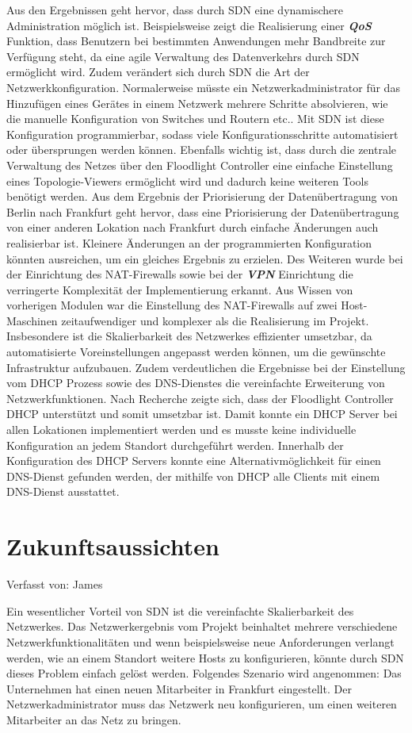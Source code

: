 \documentclass[fontsize=12pt,paper=a4,open=any,parskip=half,
  twoside=false,toc=listof,toc=bibliography,fleqn,leqno,
  captions=nooneline,captions=tableabove,british]{scrbook}
\begin{document}
{Aus den Ergebnissen geht hervor, dass durch SDN eine dynamischere Administration möglich ist. Beispielsweise zeigt die Realisierung einer \textit{\textbf{QoS}} Funktion, dass Benutzern bei bestimmten Anwendungen mehr Bandbreite zur Verfügung steht, da eine agile Verwaltung des Datenverkehrs durch SDN ermöglicht wird. Zudem verändert sich durch SDN die Art der Netzwerkkonfiguration. Normalerweise müsste ein Netzwerkadministrator für das Hinzufügen eines Gerätes in einem Netzwerk mehrere Schritte absolvieren, wie die manuelle Konfiguration von Switches und Routern etc.. Mit SDN ist diese Konfiguration programmierbar, sodass viele Konfigurationsschritte automatisiert oder übersprungen werden können. Ebenfalls wichtig ist, dass durch die zentrale Verwaltung des Netzes über den Floodlight Controller eine einfache Einstellung eines Topologie-Viewers ermöglicht wird und dadurch keine weiteren Tools benötigt werden. Aus dem Ergebnis der Priorisierung der Datenübertragung von Berlin nach Frankfurt geht hervor, dass eine Priorisierung der Datenübertragung von einer anderen Lokation nach Frankfurt durch einfache Änderungen auch realisierbar ist. Kleinere Änderungen an der programmierten Konfiguration könnten ausreichen, um ein gleiches Ergebnis zu erzielen. Des Weiteren wurde bei der Einrichtung des NAT-Firewalls sowie bei der \textit{\textbf{VPN}} Einrichtung die verringerte Komplexität der Implementierung erkannt. Aus Wissen von vorherigen Modulen war die Einstellung des NAT-Firewalls auf zwei Host-Maschinen zeitaufwendiger und komplexer als die Realisierung im Projekt. Insbesondere ist die Skalierbarkeit des Netzwerkes effizienter umsetzbar, da automatisierte Voreinstellungen angepasst werden können, um die gewünschte Infrastruktur aufzubauen. Zudem verdeutlichen die Ergebnisse bei der Einstellung vom DHCP Prozess sowie des DNS-Dienstes die vereinfachte Erweiterung von Netzwerkfunktionen.  Nach Recherche zeigte sich, dass der Floodlight Controller DHCP unterstützt und somit umsetzbar ist. Damit konnte ein DHCP Server bei allen Lokationen implementiert werden und es musste keine individuelle Konfiguration an jedem Standort durchgeführt werden. Innerhalb der Konfiguration des DHCP Servers konnte eine Alternativmöglichkeit für einen DNS-Dienst gefunden werden, der mithilfe von DHCP alle Clients mit einem DNS-Dienst ausstattet.

\section{Zukunftsaussichten}
{\tiny Verfasst von: James \par}
Ein wesentlicher Vorteil von SDN ist die vereinfachte Skalierbarkeit des Netzwerkes. Das  Netzwerkergebnis vom Projekt beinhaltet mehrere verschiedene Netzwerkfunktionalitäten und wenn beispielsweise neue Anforderungen verlangt werden, wie an einem Standort weitere Hosts zu konfigurieren, könnte durch SDN dieses Problem einfach gelöst werden. Folgendes Szenario wird angenommen: Das Unternehmen hat einen neuen Mitarbeiter in Frankfurt eingestellt. Der Netzwerkadministrator muss das Netzwerk neu konfigurieren, um einen weiteren Mitarbeiter an das Netz zu bringen.

}
\end{document}
